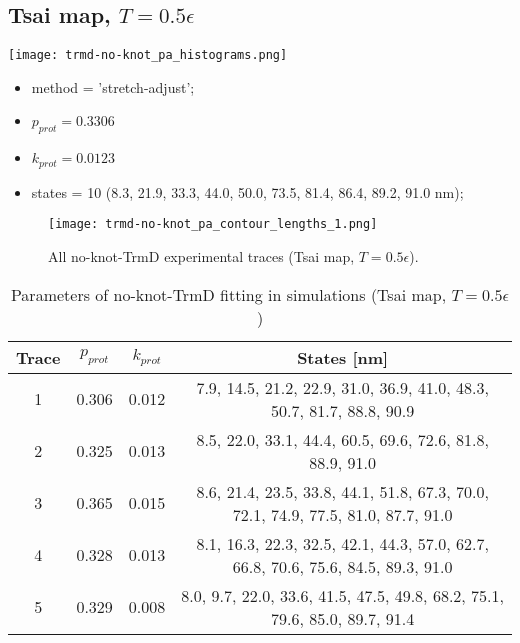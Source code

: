 \subsection{Tsai map, $T=0.5\epsilon$}
\label{subsec:no-knot-trmd-pa}
\begin{minipage}[c]{0.7\textwidth}
    \texttt{[image: trmd-no-knot\_pa\_histograms.png]}
\end{minipage}
\hfill
\begin{minipage}[c]{0.45\textwidth}
    \begin{itemize}
        \item method = 'stretch-adjust';
        \item $p_{prot}=0.3306$
        \item $k_{prot}=0.0123$
        \item states = 10 (8.3, 21.9, 33.3, 44.0, 50.0, 73.5, 81.4, 86.4, 89.2, 91.0 nm);
    \end{itemize}
\end{minipage}

\begin{figure}
    \centering
    \texttt{[image: trmd-no-knot\_pa\_contour\_lengths\_1.png]}
    \caption{All no-knot-TrmD experimental traces (Tsai map, $T=0.5\epsilon$).}
    \label{fig:no-knot-trmd-pa-cl1}
\end{figure}

\begin{table}
    \tiny
    \centering
    \caption{Parameters of no-knot-TrmD fitting in simulations (Tsai map, $T=0.5\epsilon$)}
    \label{tab:no-knot-trmd-pa-parameters}
    \begin{tabular}{c|c|c|c}
        \textbf{Trace} & \textbf{$p_{prot}$} & \textbf{$k_{prot}$} & \textbf{States [nm]}\\\hline
        1 & 0.306 & 0.012 & 7.9, 14.5, 21.2, 22.9, 31.0, 36.9, 41.0, 48.3, 50.7, 81.7, 88.8, 90.9\\
        2 & 0.325 & 0.013 & 8.5, 22.0, 33.1, 44.4, 60.5, 69.6, 72.6, 81.8, 88.9, 91.0\\
        3 & 0.365 & 0.015 & 8.6, 21.4, 23.5, 33.8, 44.1, 51.8, 67.3, 70.0, 72.1, 74.9, 77.5, 81.0, 87.7, 91.0\\
        4 & 0.328 & 0.013 & 8.1, 16.3, 22.3, 32.5, 42.1, 44.3, 57.0, 62.7, 66.8, 70.6, 75.6, 84.5, 89.3, 91.0\\
        5 & 0.329 & 0.008 & 8.0, 9.7, 22.0, 33.6, 41.5, 47.5, 49.8, 68.2, 75.1, 79.6, 85.0, 89.7, 91.4\\
    \end{tabular}
\end{table}

